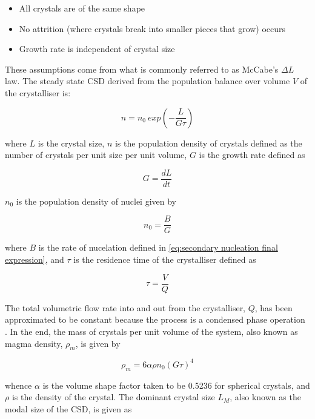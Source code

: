 \begin{itemize}
    \item All crystals are of the same shape
    \item No attrition (where crystals break into smaller pieces that grow) occurs
    \item Growth rate is independent of crystal size
\end{itemize}

\noindent These assumptions come from what is commonly referred to as McCabe's $\Delta L$ law. The steady state CSD derived from the population balance over volume $V$ of the crystalliser is:

\begin{equation}
    n = n_0 ~exp(-\frac{L}{G\tau})
\end{equation}

\noindent where $L$ is the crystal size, $n$ is the population density of crystals defined as the number of crystals per unit size per unit volume, $G$ is the growth rate defined as 

\begin{equation}
    G = \frac{dL}{dt}
\end{equation}

\noindent $n_0$ is the population density of nuclei given by 

\begin{equation}
    n_0 = \frac{B}{G}
\end{equation}

\noindent where $B$ is the rate of nucelation defined in \cref{eq:secondary nucleation final expression}, and $\tau$ is the residence time of the crystalliser defined as 

\begin{equation}
    \tau = \frac{V}{Q}
\end{equation}

\noindent The total volumetric flow rate into and out from the crystalliser, $Q$, has been approximated to be constant because the process is a condensed phase operation \cite{levenspiel_chemical_1999}. In the end, the mass of crystals per unit volume of the system, also known as magma density, $\rho_m$, is given by

\begin{equation} \label{eq:magma density}
    \rho_m = 6 \alpha \rho n_0 (G \tau)^4
\end{equation}

\noindent whence $\alpha$ is the volume shape factor taken to be 0.5236 for spherical crystals, and $\rho$ is the density of the crystal. The dominant crystal size $L_M$, also known as the modal size of the CSD, is given as 

